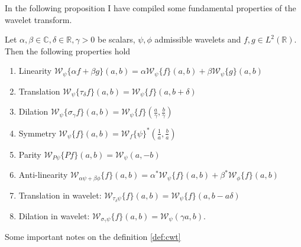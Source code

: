 In the following proposition I have compiled some fundamental properties of the wavelet transform.
\begin{proposition}
    Let $\alpha, \beta \in \mathbb{C}, \delta \in \mathbb{R}, \gamma > 0$ be scalars, $\psi, \phi$ admissible wavelets and $f, g \in L^2(\mathbb{R})$. Then the following
    properties hold

    \begin{enumerate}
        \item Linearity $\mathscr{W}_{\psi} \{\alpha f + \beta g\}(a,b) = \alpha \mathscr{W}_{\psi} \{f\}(a,b) + \beta \mathscr{W}_{\psi} \{g\}(a,b)$
        \item Translation $\mathscr{W}_{\psi}\{\tau_{\delta} f \}(a,b) = \mathscr{W}_{\psi}\{f\}(a, b+\delta)$
        \item Dilation $\mathscr{W}_{\psi} \{\sigma_{\gamma} f \}(a,b) = \mathscr{W}_{\psi}\{f\}(\frac{a}{\gamma}, \frac{b}{\gamma})$
        \item Symmetry $\mathscr{W}_{\psi}\{f\}(a,b) = \mathscr{W}_{f}\{\psi\}^{\ast}(\frac{1}{a}, \frac{b}{a})$
        \item Parity $\mathscr{W}_{P \psi} \{Pf\}(a,b) = \mathscr{W}_{\psi}(a, -b)$
        \item Anti-linearity $\mathscr{W}_{\alpha \psi + \beta \phi}\{f\}(a,b) = \alpha^{\ast} \mathscr{W}_{\psi} \{f\} (a,b) + \beta^{\ast} \mathscr{W}_{\phi}\{f\}(a,b)$
        \item Translation in wavelet: $\mathscr{W}_{\tau_{\delta} \psi}\{f\}(a,b) = \mathscr{W}_{\psi}\{f\}(a,b- a \delta)$
        \item Dilation in wavelet: $\mathscr{W}_{\sigma_{\gamma} \psi} \{f\}(a,b) = \mathscr{W}_{\psi}(\gamma a, b)$.
    \end{enumerate}
\end{proposition}

Some important notes on the definition \ref{def:cwt}

